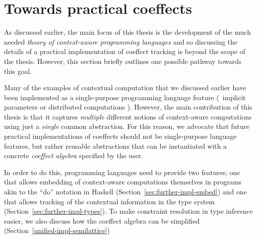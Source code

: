 %
%

\section{Towards practical coeffects}
\label{sec:further-impl}

As discussed earlier, the main focus of this thesis is the development of the much needed
\emph{theory of context-aware programming languages} and so discussing the details of a practical
implementation of coeffect tracking is beyond the scope of the thesis. However, this section
briefly outlines one possible pathway towards this goal.

Many of the examples of contextual computation that we discussed earlier have been implemented as
a single-purpose programming language feature (\eg~implicit parameters \cite{app-implicit-parameters}
or distributed computations \cite{app-distributed-ml5,app-distributed-links}). However,
the main contribution of this thesis is that it captures
\emph{multiple} different notions of context-aware computations using just a \emph{single}
common abstraction. For this reason, we advocate that future practical implementations of
coeffects should not be single-purpose language features, but rather reusable abstractions that
can be instantiated with a concrete \emph{coeffect algebra} specified by the user.

In order to do this, programming languages need to provide two features; one that allows
embedding of context-aware computations themselves in programs akin to the ``do'' notation
in Haskell (Section~\ref{sec:further-impl-embed}) and one that allows tracking of the
contextual information in the type system (Section~\ref{sec:further-impl-types}). To make
constraint resolution in type inference easier, we also discuss how the coeffect algebra
can be simplified (Section~\ref{unified-impl-semilattice})

